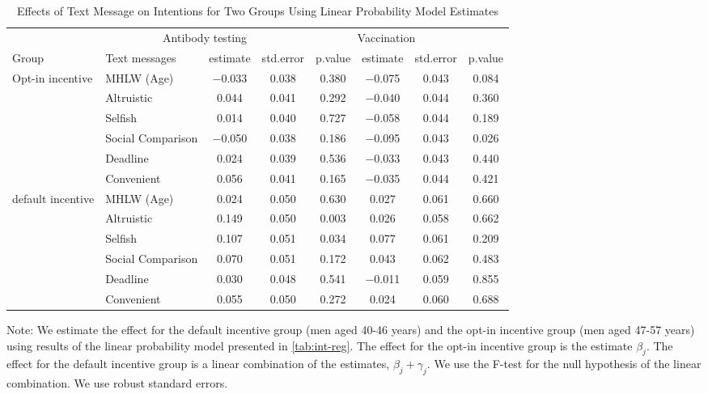 \begin{table}

\caption{Effects of Text Message on Intentions for Two Groups Using Linear Probability Model Estimates \label{tab:int-reg-ftest}}
\centering
\fontsize{9}{11}\selectfont
\begin{threeparttable}
\begin{tabular}[t]{>{\raggedright\arraybackslash}p{5em}lcccccc}
\toprule
\multicolumn{2}{c}{ } & \multicolumn{3}{c}{Antibody testing} & \multicolumn{3}{c}{Vaccination} \\
\cmidrule(l{3pt}r{3pt}){3-5} \cmidrule(l{3pt}r{3pt}){6-8}
Group & Text messages & estimate & std.error & p.value & estimate  & std.error  & p.value \\
\midrule
Opt-in incentive & MHLW (Age) & \num{-0.033} & \num{0.038} & \num{0.380} & \num{-0.075} & \num{0.043} & \num{0.084}\\
 & Altruistic & \num{0.044} & \num{0.041} & \num{0.292} & \num{-0.040} & \num{0.044} & \num{0.360}\\
 & Selfish & \num{0.014} & \num{0.040} & \num{0.727} & \num{-0.058} & \num{0.044} & \num{0.189}\\
 & Social Comparison & \num{-0.050} & \num{0.038} & \num{0.186} & \num{-0.095} & \num{0.043} & \num{0.026}\\
 & Deadline & \num{0.024} & \num{0.039} & \num{0.536} & \num{-0.033} & \num{0.043} & \num{0.440}\\
 & Convenient & \num{0.056} & \num{0.041} & \num{0.165} & \num{-0.035} & \num{0.044} & \num{0.421}\\
default incentive & MHLW (Age) & \num{0.024} & \num{0.050} & \num{0.630} & \num{0.027} & \num{0.061} & \num{0.660}\\
 & Altruistic & \num{0.149} & \num{0.050} & \num{0.003} & \num{0.026} & \num{0.058} & \num{0.662}\\
 & Selfish & \num{0.107} & \num{0.051} & \num{0.034} & \num{0.077} & \num{0.061} & \num{0.209}\\
 & Social Comparison & \num{0.070} & \num{0.051} & \num{0.172} & \num{0.043} & \num{0.062} & \num{0.483}\\
 & Deadline & \num{0.030} & \num{0.048} & \num{0.541} & \num{-0.011} & \num{0.059} & \num{0.855}\\
 & Convenient & \num{0.055} & \num{0.050} & \num{0.272} & \num{0.024} & \num{0.060} & \num{0.688}\\
\bottomrule
\end{tabular}
\begin{tablenotes}
\item Note: We estimate the effect for the default incentive group (men aged 40-46 years) and the opt-in incentive group (men aged 47-57 years) using results of the linear probability model presented in \ref{tab:int-reg}. The effect for the opt-in incentive group is the estimate $\beta_j$. The effect for the default incentive group is a linear combination of the estimates, $\beta_j + \gamma_j$. We use the F-test for the null hypothesis of the linear combination. We use robust standard errors.
\end{tablenotes}
\end{threeparttable}
\end{table}

